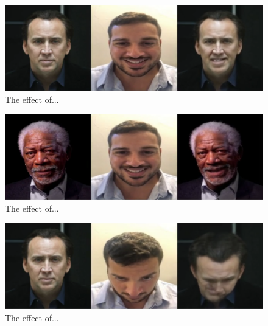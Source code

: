 \documentclass[english,12pt]{article}
\begin{document}
\begin{figure}[htb]
  \begin{centering}
      \includegraphics[scale=0.29]{images/‏‏Amit_smile_cage.PNG}
  \par\end{centering}
  \caption{\label{fig:Amit_smile_cage}The effect of...}
\end{figure}

\begin{figure}[htb]
  \begin{centering}
      \includegraphics[scale=0.29]{images/‏‏Amit_smile_freeman.PNG}
  \par\end{centering}
  \caption{\label{fig:Amit_smile_freeman}The effect of...}
\end{figure}

\begin{figure}[htb]
  \begin{centering}
      \includegraphics[scale=0.29]{images/‏‏Amit_tilt1_cage.PNG}
  \par\end{centering}
  \caption{\label{fig:Amit_tilt1_cage}The effect of...}
\end{figure}
\end{document}
